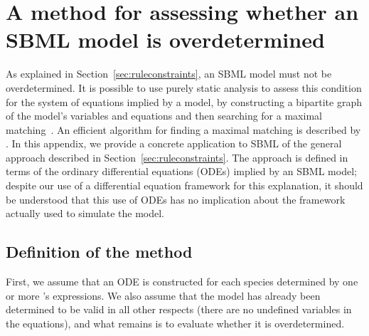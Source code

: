 
\section{A method for assessing whether an SBML model is overdetermined}
\label{apdx:assessing-overdetermined}

As explained in Section~\ref{sec:ruleconstraints}, an SBML model
must not be overdetermined.  It is possible to use purely static
analysis to assess this condition for the system of equations implied by a
model, by constructing a bipartite graph of the model's variables
and equations and then searching for a maximal
matching~\citep{chartrand_1977}.  An efficient algorithm for finding
a maximal matching is described by \cite{hopcroft:1973}.  In this
appendix, we provide a concrete application to SBML of the general
approach described in Section~\ref{sec:ruleconstraints}.  The
approach is defined in terms of the ordinary differential
equations (ODEs) implied by an SBML model; 
despite our use of a differential equation framework for
  this explanation, it should be understood that this
use of ODEs has no implication about the framework
  actually used to simulate the model.


\subsection*{Definition of the method}
\label{sec:overdetermined-method}

\begin{blockChanged}
First, we assume that an ODE is constructed for each species
determined by one or more \Reaction's \KineticLaw {}
expressions.  We also assume that the model has already been
determined to be valid in all other respects (\eg there are no
undefined variables in the equations), and what remains is to
evaluate whether it is overdetermined.
\end{blockChanged}

